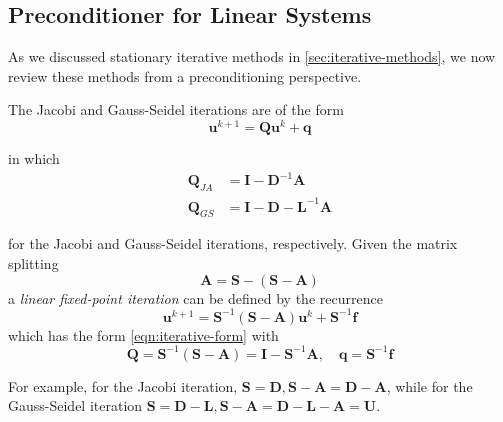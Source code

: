 \subsection{Preconditioner for Linear Systems}
As we discussed stationary iterative methods in \autoref{sec:iterative-methods}, we now review these methods from a preconditioning perspective.

The Jacobi and Gauss-Seidel iterations are of the form
\begin{equation}
    \boldsymbol{u}^{k+1} = \boldsymbol{Q}\boldsymbol{u}^{k} + \boldsymbol{q}
    \label{eqn:iterative-form}
\end{equation}

in which
\begin{align}
    \boldsymbol{Q}_{JA} &= \boldsymbol{I} - \boldsymbol{D}^{-1}\boldsymbol{A} \\
    \boldsymbol{Q}_{GS} &= \boldsymbol{I} - {\boldsymbol{D} - \boldsymbol{L}}^{-1}\boldsymbol{A}
\end{align}

for the Jacobi and Gauss-Seidel iterations, respectively. Given the matrix splitting
\begin{equation}
    \boldsymbol{A} = \boldsymbol{S} - (\boldsymbol{S} - \boldsymbol{A})
\end{equation}
a \textit{linear fixed-point iteration} can be defined by the recurrence
\begin{equation}
    \boldsymbol{u}^{k+1} = \boldsymbol{S}^{-1}(\boldsymbol{S} - \boldsymbol{A})\boldsymbol{u}^k + \boldsymbol{S}^{-1}\boldsymbol{f}
\end{equation}
which has the form \autoref{eqn:iterative-form} with 
\begin{equation}
    \boldsymbol{Q} = \boldsymbol{S}^{-1}(\boldsymbol{S} - \boldsymbol{A}) = \boldsymbol{I} - \boldsymbol{S}^{-1}\boldsymbol{A},\quad \boldsymbol{q} = \boldsymbol{S}^{-1}\boldsymbol{f}
    \label{eqn:definition-Q-q}
\end{equation}

For example, for the Jacobi iteration, $\boldsymbol{S} = \boldsymbol{D}, \boldsymbol{S} - \boldsymbol{A} = \boldsymbol{D} - \boldsymbol{A}$, while for the Gauss-Seidel iteration $\boldsymbol{S} = \boldsymbol{D} - \boldsymbol{L}, \boldsymbol{S} - \boldsymbol{A} = \boldsymbol{D} - \boldsymbol{L} - \boldsymbol{A} = \boldsymbol{U}$.


